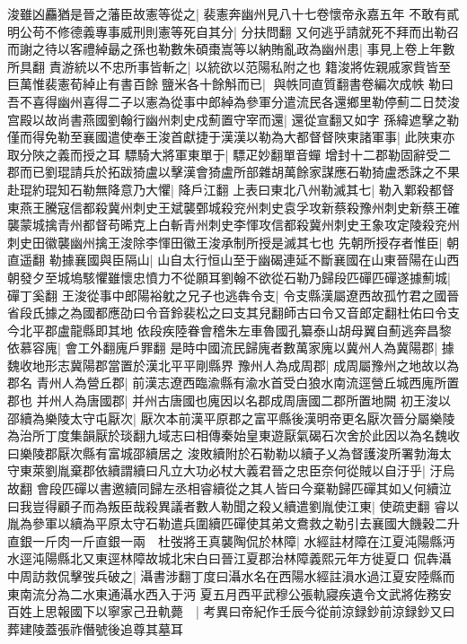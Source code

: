 浚雖凶麤猶是晉之藩臣故憲等從之|{
	裴憲奔幽州見八十七卷懷帝永嘉五年}
不敢有貳明公苟不修德義專事威刑則憲等死自其分|{
	分扶問翻}
又何逃乎請就死不拜而出勒召而謝之待以客禮綽朂之孫也勒數朱碩棗嵩等以納賄亂政為幽州患|{
	事見上卷上年數所具翻}
責游統以不忠所事皆斬之|{
	以統欲以范陽私附之也}
籍浚將佐親戚家貲皆至巨萬惟裴憲荀綽止有書百餘鹽米各十餘斛而已|{
	與帙同直質翻書卷編次成帙}
勒曰吾不喜得幽州喜得二子以憲為從事中郎綽為參軍分遣流民各還鄉里勒停薊二日焚浚宫殿以故尚書燕國劉翰行幽州刺史戍薊置守宰而還|{
	還從宣翻又如字}
孫緯遮擊之勒僅而得免勒至襄國遣使奉王浚首獻捷于漢漢以勒為大都督督陜東諸軍事|{
	此陜東亦取分陜之義而授之耳}
驃騎大將軍東單于|{
	驃疋妙翻單音蟬}
增封十二郡勒固辭受二郡而已劉琨請兵於拓跋猗盧以擊漢會猗盧所部雜胡萬餘家謀應石勒猗盧悉誅之不果赴琨約琨知石勒無降意乃大懼|{
	降戶江翻}
上表曰東北八州勒滅其七|{
	勒入鄴殺都督東燕王騰寇信都殺冀州刺史王斌襲鄄城殺兖州刺史袁孚攻新蔡殺豫州刺史新蔡王確襲蒙城擒青州都督苟晞克上白斬青州刺史李惲攻信都殺冀州刺史王象攻定陵殺兖州刺史田徽襲幽州擒王浚除李惲田徽王浚承制所授是滅其七也}
先朝所授存者惟臣|{
	朝直遥翻}
勒據襄國與臣隔山|{
	山自太行恒山至于幽碣連延不斷襄國在山東晉陽在山西}
朝發夕至城塢駭懼雖懷忠憤力不從願耳劉翰不欲從石勒乃歸段匹磾匹磾遂據薊城|{
	磾丁奚翻}
王浚從事中郎陽裕躭之兄子也逃犇令支|{
	令支縣漢屬遼西故孤竹君之國晉省段氏據之為國都應劭曰令音鈴裴松之曰支其兒翻師古曰令又音郎定翻杜佑曰令支今北平郡盧龍縣即其地}
依段疾陸眷會稽朱左車魯國孔纂泰山胡母翼自薊逃奔昌黎依慕容廆|{
	會工外翻廆戶罪翻}
是時中國流民歸廆者數萬家廆以冀州人為冀陽郡|{
	據魏收地形志冀陽郡當置於漢北平平剛縣界}
豫州人為成周郡|{
	成周屬豫州之地故以為郡名}
青州人為營丘郡|{
	前漢志遼西臨渝縣有渝水首受白狼水南流逕營丘城西廆所置郡也}
并州人為唐國郡|{
	并州古唐國也廆因以名郡成周唐國二郡所置地闕}
初王浚以邵續為樂陵太守屯厭次|{
	厭次本前漢平原郡之富平縣後漢明帝更名厭次晉分屬樂陵為治所丁度集韻厭於琰翻九域志曰相傳秦始皇東遊厭氣碣石次舍於此因以為名魏收曰樂陵郡厭次縣有富城邵續居之}
浚敗續附於石勒勒以續子乂為督護浚所署勃海太守東萊劉胤棄郡依續謂續曰凡立大功必杖大義君晉之忠臣奈何從賊以自汙乎|{
	汙烏故翻}
會段匹磾以書邀續同歸左丞相睿續從之其人皆曰今棄勒歸匹磾其如乂何續泣曰我豈得顧子而為叛臣哉殺異議者數人勒聞之殺乂續遣劉胤使江東|{
	使疏吏翻}
睿以胤為參軍以續為平原太守石勒遣兵圍續匹磾使其弟文鴦救之勒引去襄國大饑穀二升直銀一斤肉一斤直銀一兩　杜弢將王真襲陶侃於林障|{
	水經註材障在江夏沌陽縣沔水逕沌陽縣北又東逕林障故城北宋白曰晉江夏郡治林障義熙元年方徙夏口}
侃犇灄中周訪救侃擊弢兵破之|{
	灄書涉翻丁度曰灄水名在西陽水經註溳水過江夏安陸縣而東南流分為二水東通灄水西入于沔}
夏五月西平武穆公張軌寢疾遺令文武將佐務安百姓上思報國下以寧家己丑軌薨　|{
	考異曰帝紀作壬辰今從前涼録鈔前涼録鈔又曰葬建陵蓋張祚僭號後追尊其墓耳}
